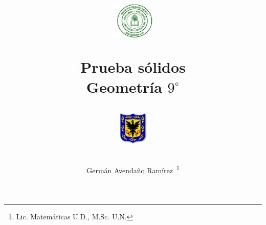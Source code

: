 \documentclass[10pt,letterpaper,addpoints]{exam}
\begin{document}
\title{\begin{minipage}{.2\textwidth}
        \includegraphics[height=1.75cm]{Images/logo-colegio.png}
       \end{minipage}
\begin{minipage}{.55\textwidth}
 \begin{center}
Prueba sólidos\\Geometría $9^{\circ}$
\end{center}
\end{minipage}
\begin{minipage}{.2\textwidth}
\includegraphics[height=1.75cm]{Images/logo-sed.png} 
\end{minipage}
}
\author{Germ\'{a}n Avendaño Ram\'{i}rez~\thanks{Lic. Matemáticas U.D., M.Sc. U.N.}}
\date{}
\maketitle
\begin{center}
\end{center}
\vspace{0.1in}
\end{document}
